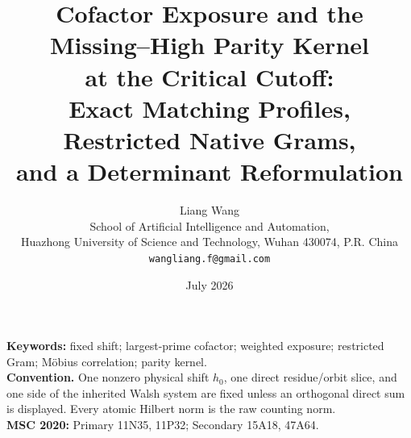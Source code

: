 \documentclass[11pt]{article}
\title{Cofactor Exposure and the Missing--High Parity Kernel\\
at the Critical Cutoff:\\
Exact Matching Profiles, Restricted Native Grams,\\
and a Determinant Reformulation}
\author{Liang Wang\\
School of Artificial Intelligence and Automation,\\
Huazhong University of Science and Technology, Wuhan 430074, P.R. China\\
\texttt{wangliang.f@gmail.com}}
\date{July 2026}
\theoremstyle{remark}
\begin{document}
\maketitle


\noindent\textbf{Keywords:} fixed shift; largest-prime cofactor; weighted exposure;
restricted Gram; M\"obius correlation; parity kernel.\\[0.5em]
\noindent\textbf{Convention.} One nonzero physical shift \(h_0\), one direct
residue/orbit slice, and one side of the inherited Walsh system are fixed
unless an orthogonal direct sum is displayed.  Every atomic Hilbert norm is
the raw counting norm.\\[0.5em]
\noindent\textbf{MSC 2020:} Primary 11N35, 11P32; Secondary 15A18, 47A64.












\begingroup
\small


\endgroup
\end{document}
